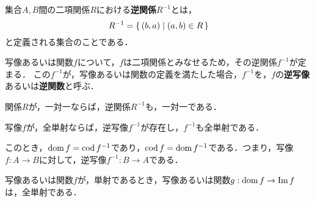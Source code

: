 \begin{definition}[逆関係]
	集合$A, B$間の二項関係$R$における\textbf{逆関係}$R^{-1}$とは，
	\[
		R^{-1} = \left\{\,(b,a) \mid (a,b)\in R\,\right\}
	\]
	と定義される集合のことである．
\end{definition}
\begin{definition}
	写像あるいは関数$f$について，$f$は二項関係とみなせるため，その逆関係$f^{-1}$が定まる．
	この$f^{-1}$が，写像あるいは関数の定義を満たした場合，$f^{-1}$を，$f$の\textbf{逆写像}あるいは\textbf{逆関数}と呼ぶ．
\end{definition}
\begin{theorem}
	関係$R$が，一対一ならば，逆関係$R^{-1}$も，一対一である．
\end{theorem}
\begin{theorem}
	\label{thm:inverseMapping1}%
	写像$f$が，全単射ならば，逆写像$f^{-1}$が存在し，$f^{-1}$も全単射である．
\end{theorem}
\begin{rem*}
	このとき，$\operatorname{dom} f = \operatorname{cod} f^{-1}$であり，$\operatorname{cod} f = \operatorname{dom} f^{-1}$である．つまり，写像$f : A \rightarrow B$に対して，逆写像$f^{-1} : B \rightarrow A$である．
\end{rem*}
\begin{theorem}
	\label{thm:inverseMapping2}%
	写像あるいは関数$f$が，単射であるとき，写像あるいは関数$g: \operatorname{dom} f \rightarrow \operatorname{Im} f$は，全単射である．
\end{theorem}


